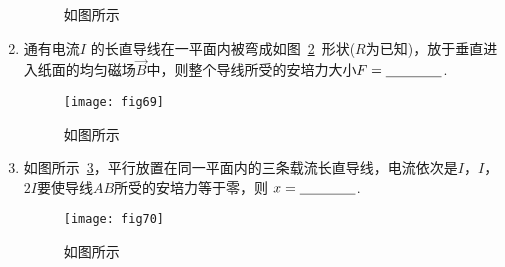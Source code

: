 \begin{enumerate}
\begin{figure}[H]
        \caption{如图所示}\label{fig:68}
    \end{figure}
    \item 通有电流$I$ 的长直导线在一平面内被弯成如图~\ref{fig:69}~形状($R$为已知)，放于垂直进入纸面的均匀磁场$\vec{B}$中，则整个导线所受的安培力大小$F=\nl$.
     \begin{figure}[H]
        \centering
        \texttt{[image: fig69]}
        \caption{如图所示}\label{fig:69}
    \end{figure} 
    \item 如图所示~\ref{fig:70}，平行放置在同一平面内的三条载流长直导线，电流依次是$I$，$I$，$2I$要使导线$AB$所受的安培力等于零，则
    $x=\nl$.
    \begin{figure}[H]
        \centering
        \texttt{[image: fig70]}
        \caption{如图所示}\label{fig:70}
    \end{figure}
\end{enumerate}

